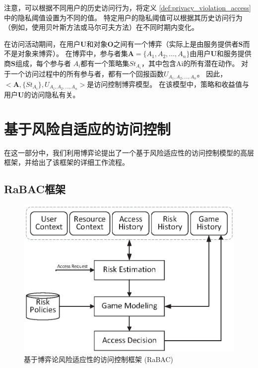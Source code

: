 注意，可以根据不同用户的历史访问行为，将定义 \ref{def:privacy_violation_access}中的隐私阈值设置为不同的值。 特定用户的隐私阈值可以根据其历史访问行为（例如，使用贝叶斯方法或马尔可夫方法）在不同时期内变化。

在访问活动期间，在用户$\mathbf{U}$和对象$\mathbf{O}$之间有一个博弈（实际上是由服务提供者$\mathbf{S}$而不是对象来博弈）。 在博弈中，参与者集$\mathbf{A}=\{A_1,A_2,...,A_n\}$由用户$\mathbf{U}$和服务提供商$\mathbf{S}$组成，每个参与者 $A_i$都有一个策略集$St_{A_i}$，其中包含Ai的所有潜在动作。 对于一个访问过程中的所有参与者，都有一个回报函数$U_{A_1,A_2,...,A_n}$。 因此，$<\mathbf{A},\{St_{A_i}\},U_{A_1,A_2,...,A_n}>$是访问控制博弈模型。 在该模型中，策略和收益值与用户$\mathbf{U}$的访问隐私有关。

\section{基于风险自适应的访问控制}
\label{sec:framework}


在这一部分中，我们利用博弈论提出了一个基于风险适应性的访问控制模型的高层框架，并给出了该框架的详细工作流程。
\subsection{RaBAC框架}
\label{sec:hlframework}

\begin{figure}[htb]
	\centering
	\includegraphics[width=.85\textwidth]{./figures/game-rbac-framework.eps}
	\caption{基于博弈论风险适应性的访问控制框架 (RaBAC)}\label{fig:game-rbac-framework}
\end{figure}



